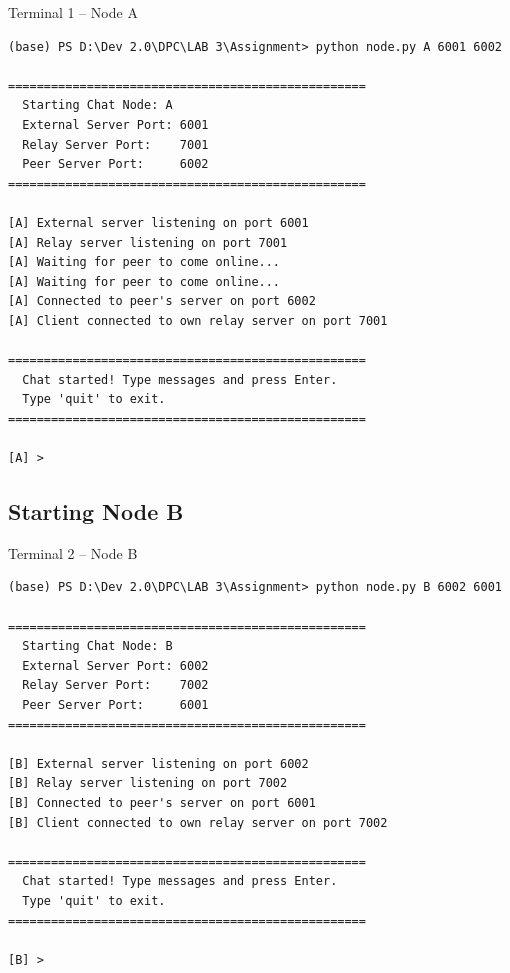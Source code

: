 \documentclass[11pt]{article}
\begin{document}
\begin{terminalbox}{Terminal 1 -- Node A}
\begin{lstlisting}[style=terminalstyle]
(base) PS D:\Dev 2.0\DPC\LAB 3\Assignment> python node.py A 6001 6002

==================================================
  Starting Chat Node: A
  External Server Port: 6001
  Relay Server Port:    7001
  Peer Server Port:     6002
==================================================

[A] External server listening on port 6001
[A] Relay server listening on port 7001
[A] Waiting for peer to come online...
[A] Waiting for peer to come online...
[A] Connected to peer's server on port 6002
[A] Client connected to own relay server on port 7001

==================================================
  Chat started! Type messages and press Enter.
  Type 'quit' to exit.
==================================================

[A] >
\end{lstlisting}
\end{terminalbox}

\subsection{Starting Node B}

\begin{terminalbox}{Terminal 2 -- Node B}
\begin{lstlisting}[style=terminalstyle]
(base) PS D:\Dev 2.0\DPC\LAB 3\Assignment> python node.py B 6002 6001

==================================================
  Starting Chat Node: B
  External Server Port: 6002
  Relay Server Port:    7002
  Peer Server Port:     6001
==================================================

[B] External server listening on port 6002
[B] Relay server listening on port 7002
[B] Connected to peer's server on port 6001
[B] Client connected to own relay server on port 7002

==================================================
  Chat started! Type messages and press Enter.
  Type 'quit' to exit.
==================================================

[B] >
\end{lstlisting}
\end{terminalbox}

\newpage
\end{document}
